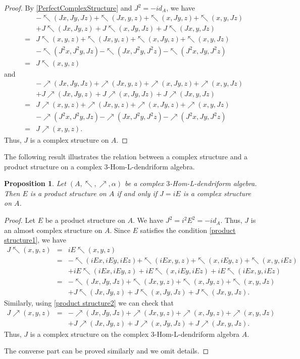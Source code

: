 \documentclass[a4paper,11pt]{article}
\def\nw{\nwarrow}
\def\ne{\nearrow}
\newtheorem{pro}[thm]{Proposition}
\theoremstyle{definition}
\begin{document}
\begin{proof}
  By \eqref{PerfectComplexStructure} and $J^2=-id_A$, we have
\begin{eqnarray*}
&&-\nw(Jx,Jy,Jz)+\nw(Jx,y,z)+\nw(x,Jy,z)+\nw(x,y,Jz)\\
&&+J\nw(Jx,Jy,z)+J\nw(x,Jy,Jz)+J\nw(Jx,y,Jz)\\
&=&J\nw(x,y,z)+\nw(Jx,y,z)+\nw(x,Jy,z)+\nw(x,y,Jz)\\
&&-\nw(J^2x,J^2y,Jz)-\nw(Jx,J^2y,J^2z)-\nw(J^2x,Jy,J^2z)\\
&=&J\nw(x,y,z)
\end{eqnarray*} and \begin{eqnarray*}
&&-\ne(Jx,Jy,Jz)+\ne(Jx,y,z)+\ne(x,Jy,z)+\ne(x,y,Jz)\\
&&+J\ne(Jx,Jy,z)+J\ne(x,Jy,Jz)+J\ne(Jx,y,Jz)\\
&=&J\ne(x,y,z)+\ne(Jx,y,z)+\ne(x,Jy,z)+\ne(x,y,Jz)\\
&&-\ne(J^2x,J^2y,Jz)-\ne(Jx,J^2y,J^2z)-\ne(J^2x,Jy,J^2z)\\
&=&J\ne(x,y,z).
\end{eqnarray*}
Thus, $J$ is a complex structure on $A$.
\end{proof}
The following result  illustrates the relation between a complex structure and a product structure on a complex $3$-Hom-L-dendriform algebra.

\begin{pro}\label{equivalent}
Let $(A,\nw,\ne,\alpha)$ be a complex $3$-Hom-L-dendriform algebra. Then $E$ is a product structure on $A$ if and only if $J=iE$ is a complex structure on $A$.
\end{pro}

\begin{proof} Let $E$ be a product structure on $A$. We have $J^2=i^2E^2=-id_A.$ Thus, $J$ is an almost complex structure on $A$. Since $E$ satisfies the  condition \eqref{product structure1}, we have
\begin{eqnarray*}
J\nw(x,y,z)&=&iE\nw(x,y,z)\\
                 &=&-\nw(iEx,iEy,iEz)+\nw(iEx,y,z)+\nw(x,iEy,z)+\nw(x,y,iEz)\\
                 &&+iE\nw(iEx,iEy,z)+iE\nw(x,iEy,iEz)+iE\nw(iEx,y,iEz)\\
                 &=&-\nw(Jx,Jy,Jz)+\nw(Jx,y,z)+\nw(x,Jy,z)+\nw(x,y,Jz)\\
                 &&+J\nw(Jx,Jy,z)+J\nw(x,Jy,Jz)+J\nw(Jx,y,Jz).
\end{eqnarray*}
Similarly, using  \eqref{product structure2} we can check that
\begin{eqnarray*}
J\ne(x,y,z)        &=&-\ne(Jx,Jy,Jz)+\ne(Jx,y,z)+\ne(x,Jy,z)+\ne(x,y,Jz)\\
                 &&+J\ne(Jx,Jy,z)+J\ne(x,Jy,Jz)+J\ne(Jx,y,Jz).
\end{eqnarray*} Thus, $J$ is a complex structure on the complex $3$-Hom-L-dendriform algebra $A$.

The converse part can be proved similarly and we omit details.\end{proof}
\end{document}
